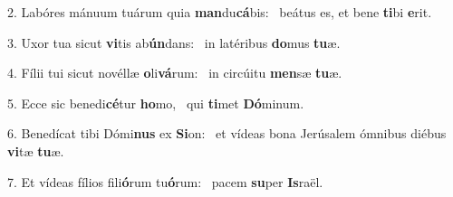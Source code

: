 2. Labóres mánuum tuárum quia \textbf{man}du\textbf{cá}bis: \ast\  beátus es, et bene \textbf{ti}bi \textbf{e}rit.\

3. Uxor tua sicut \textbf{vi}tis ab\textbf{ún}dans: \ast\  in latéribus \textbf{do}mus \textbf{tu}æ.\

4. Fílii tui sicut novéllæ \textbf{o}li\textbf{vá}rum: \ast\  in circúitu \textbf{men}sæ \textbf{tu}æ.\

5. Ecce sic benedi\textbf{cé}tur \textbf{ho}mo, \ast\  qui \textbf{ti}met \textbf{Dó}minum.\

6. Benedícat tibi Dómi\textbf{nus} ex \textbf{Si}on: \ast\  et vídeas bona Jerúsalem ómnibus diébus \textbf{vi}tæ \textbf{tu}æ.\

7. Et vídeas fílios fili\textbf{ó}rum tu\textbf{ó}rum: \ast\  pacem \textbf{su}per \textbf{Is}raël.\


